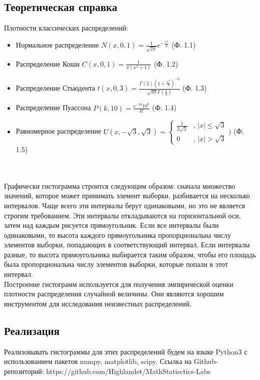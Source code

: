 \documentclass[14pt]{extarticle}
\begin{document}
\subsection{Теоретическая справка}

Плотности классических распределений:
\begin{itemize}
    \item Нормальное распределение \(N(x, 0,1)=\frac{1}{\sqrt{2\pi}}e^{-\frac{x^2}{2}}\) (Ф. 1.1)
    \item Распределение Коши \(C(x,0,1)=\frac{1}{\pi (x^2+1)}\) (Ф. 1.2)
    \item Распределение Стьюдента \(t(x,0,3)=\frac{\Gamma(2)(1+\frac{x^2}{3})^{-2}}{\sqrt{3\pi}\Gamma(\frac{3}{2})}\)
    (Ф. 1.3)
    \item Распределение Пуассона \(P(k, 10)=\frac{e^{-10}10^k}{k!}\) (Ф. 1.4)
    \item Равномерное распределение \(U(x, -\sqrt{3}, \sqrt{3})=\begin{cases}
    \frac{1}{2\sqrt{3}}&\text{, } |x|\leq\sqrt{3} \\
    0&\text{, } |x|>\sqrt{3}
\end{cases})\) (Ф. 1.5)
\end{itemize}\\\\
Графически гистограмма строится следующим образом: сначала множество значений, которое может принимать элемент выборки, разбивается на несколько интервалов. Чаще всего эти интервалы берут одинаковыми, но это не является строгим требованием. Эти интервалы откладываются на горизонтальной оси, затем над каждым рисуется прямоугольник. Если все интервалы были одинаковыми, то высота каждого прямоугольника пропорциональна числу элементов выборки, попадающих в соответствующий интервал. Если интервалы разные, то высота прямоугольника выбирается таким образом, чтобы его площадь была пропорциональна числу элементов выборки, которые попали в этот интервал.\\
Построение гистограмм используется для получения эмпирической оценки плотности распределения случайной величины. Они являются хорошим инструментом для исследования неизвестных распределений.

\subsection{Реализация}

Реализовывать гистограммы для этих распределений будем на языке Python3 с использованием пакетов numpy, matplotlib, scipy.
Ссылка на Github-репозиторий: https://github.com/Highlandet/MathStatisctics-Labs
\end{document}
